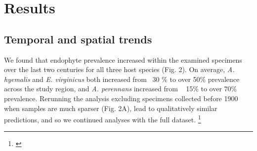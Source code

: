 \documentclass[11pt]{article}
\newcommand{\tom}[2]{{\color{red}{#1}}\footnote{\textit{\color{red}{#2}}}}
\begin{document}


		
\section*{Results}

\subsection*{Temporal and spatial trends}

We found that endophyte prevalence increased within the examined specimens over the last two centuries for all three host species (Fig. 2). 
On average, \emph{A. hyemalis} and \emph{E. virginicus} both increased from ~30 \% to over 50\% prevalence across the study region, and \emph{A. perennans} increased from ~ 15\% to over 70\% prevalence.
Rerunning the analysis excluding specimens collected before 1900 when samples are much sparser (Fig. 2A), lead to qualitatively similar predictions, and so we continued analyses with the full dataset. \tom{}{I really like fig 2 but if you are going to split the predictions by latitude you should explain why, talk about this in the results, and also split the points by high and low latitude. Were 35 and 43 the bounds of the data?}
\end{document}
